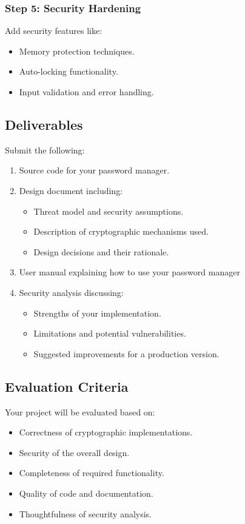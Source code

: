 \documentclass[10pt,a4paper,american]{article}
\begin{document}
\subsubsection*{Step 5: Security Hardening}
Add security features like:
\begin{itemize}
	\item Memory protection techniques.
	\item Auto-locking functionality.
	\item Input validation and error handling.
\end{itemize}

\subsection*{Deliverables}
Submit the following:

\begin{enumerate}
	\item Source code for your password manager.
	\item Design document including:
	      \begin{itemize}
		      \item Threat model and security assumptions.
		      \item Description of cryptographic mechanisms used.
		      \item Design decisions and their rationale.
	      \end{itemize}
	\item User manual explaining how to use your password manager
	\item Security analysis discussing:
	      \begin{itemize}
		      \item Strengths of your implementation.
		      \item Limitations and potential vulnerabilities.
		      \item Suggested improvements for a production version.
	      \end{itemize}
\end{enumerate}

\subsection*{Evaluation Criteria}
Your project will be evaluated based on:

\begin{itemize}
	\item Correctness of cryptographic implementations.
	\item Security of the overall design.
	\item Completeness of required functionality.
	\item Quality of code and documentation.
	\item Thoughtfulness of security analysis.
\end{itemize}
\end{document}
